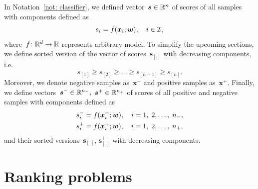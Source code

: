 \begin{notation}\label{not: scores}
  In Notation~\ref{not: classifier}, we defined vector~$\bm{s} \in \mathbb{R}^n$ of scores of all samples with components defined as
  \begin{equation*}
    s_i = f(\bm{x}_i; \bm{w}), \quad i \in \mathcal{I},
  \end{equation*}
  where~$f \colon \mathbb{R}^d \to \mathbb{R}$ represents arbitrary model. To simplify the upcoming sections, we define sorted version of the vector of scores~$\bm{s}_{[\cdot]}$ with decreasing components, i.e.
  \begin{equation*}
    s_{[1]}   \geq s_{[2]} \geq \dots \geq s_{[n - 1]} \geq s_{[n]}.
  \end{equation*}
  Moreover, we denote negative samples as~$\bm{x}^-$ and positive samples as~$\bm{x}^+.$ Finally, we define vectors~$\bm{s}^- \in \mathbb{R}^{n_{-}},$ $\bm{s}^+ \in \mathbb{R}^{n_{+}}$ of scores of all positive and negative samples with components defined as
  \begin{equation*}
    \begin{aligned}
      s^-_i & = f(\bm{x}^-_i; \bm{w}), \quad i = 1, \; 2, \ldots, \; n_{-}, \\
      s^+_i & = f(\bm{x}^+_i; \bm{w}), \quad i = 1, \; 2, \ldots, \; n_{+},
    \end{aligned}
  \end{equation*}
  and their sorted versions~$\bm{s}^-_{[\cdot]}$, $\bm{s}^+_{[\cdot]}$ with decreasing components.
\end{notation}

\section{Ranking problems}\label{sec: ranking}

